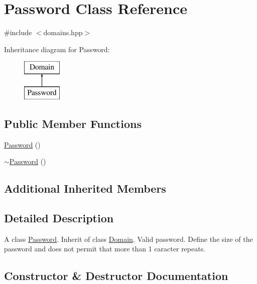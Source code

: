 \hypertarget{class_password}{}\section{Password Class Reference}
\label{class_password}


{\ttfamily \#include $<$domains.\+hpp$>$}

Inheritance diagram for Password\+:\begin{figure}[H]
\begin{center}
\leavevmode
\includegraphics[height=2.000000cm]{class_password}
\end{center}
\end{figure}
\subsection*{Public Member Functions}
\begin{DoxyCompactItemize}
\item 
\hyperlink{class_password_a9ed0401599b14d501a8f46779048cdf2}{Password} ()
\item 
\hyperlink{class_password_ae019a63cb7332cb1c4e41d8ab7b4a619}{$\sim$\+Password} ()
\end{DoxyCompactItemize}
\subsection*{Additional Inherited Members}


\subsection{Detailed Description}
A class \hyperlink{class_password}{Password}. Inherit of class \hyperlink{class_domain}{Domain}. Valid password. Define the size of the password and does not permit that more than 1 caracter repeats. 

\subsection{Constructor \& Destructor Documentation}
\mbox{\label{class_password_a9ed0401599b14d501a8f46779048cdf2}} 
